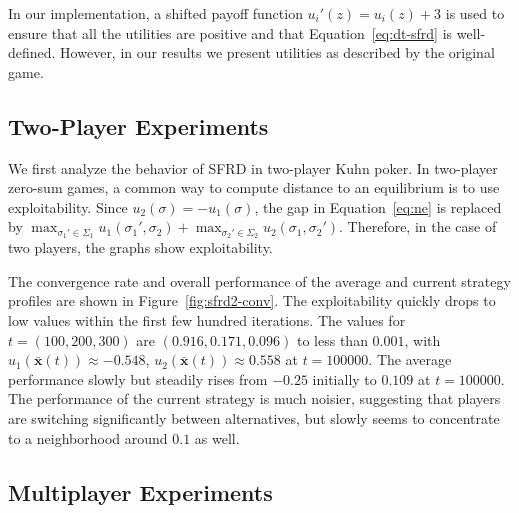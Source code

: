\documentclass{aamas2014}
\newcommand{\bx}{\mathbf{x}}
\begin{document}
In our implementation, a shifted payoff function $u_i'(z) = u_i(z) + 3$ is used to ensure that all the utilities are positive
and that Equation~\ref{eq:dt-sfrd} is well-defined. However, in our results we present utilities as described by the original
game. %



\subsection{Two-Player Experiments}


We first analyze the behavior of SFRD in two-player Kuhn poker. 
In two-player zero-sum games, 
a common way to compute distance to an equilibrium is to use exploitability. Since $u_2(\sigma) = -u_1(\sigma)$, 
the gap in Equation~\ref{eq:ne} is replaced by 
$\max_{\sigma_1' \in \Sigma_1} u_1(\sigma_1', \sigma_2) + \max_{\sigma_2' \in \Sigma_2} u_2(\sigma_1, \sigma_2')$. 
Therefore, in the case of two players, the graphs show exploitability. 


The convergence rate and overall performance of the average and current strategy profiles are shown in
Figure~\ref{fig:sfrd2-conv}. The exploitability quickly drops to low values within the first few hundred iterations. 
The values for $t = (100,200,300)$ are $(0.916, 0.171, 0.096)$ to less than $0.001$, with 
$u_1(\bar{\bx}(t)) \approx -0.548$, $u_2(\bar{\bx}(t)) \approx 0.558$ at $t = 100000$. 
The average performance slowly but steadily rises from $-0.25$ initially to $0.109$ at $t = 100000$. The performance of the 
current strategy is much noisier, suggesting that players are switching significantly between alternatives, 
but slowly seems to concentrate to a neighborhood around $0.1$ as well.

\subsection{Multiplayer Experiments}
\end{document}
